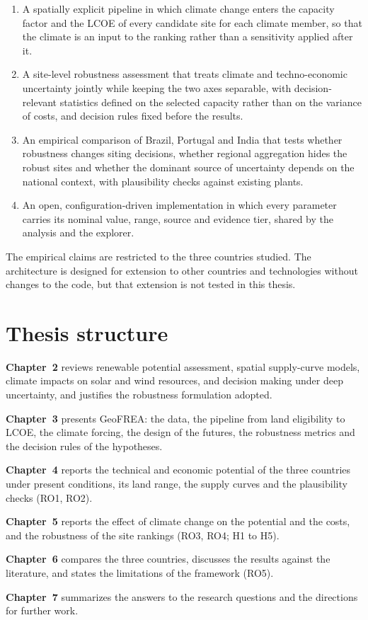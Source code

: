 \begin{enumerate}
    \item A spatially explicit pipeline in which climate change enters the capacity factor and the LCOE of every candidate site for each climate member, so that the climate is an input to the ranking rather than a sensitivity applied after it.
    \item A site-level robustness assessment that treats climate and techno-economic uncertainty jointly while keeping the two axes separable, with decision-relevant statistics defined on the selected capacity rather than on the variance of costs, and decision rules fixed before the results.
    \item An empirical comparison of Brazil, Portugal and India that tests whether robustness changes siting decisions, whether regional aggregation hides the robust sites and whether the dominant source of uncertainty depends on the national context, with plausibility checks against existing plants.
    \item An open, configuration-driven implementation in which every parameter carries its nominal value, range, source and evidence tier, shared by the analysis and the explorer.
\end{enumerate}

The empirical claims are restricted to the three countries studied. The architecture is designed for extension to other countries and technologies without changes to the code, but that extension is not tested in this thesis.

\section{Thesis structure}
\label{sec:structure}

\textbf{Chapter~2} reviews renewable potential assessment, spatial supply-curve models, climate impacts on solar and wind resources, and decision making under deep uncertainty, and justifies the robustness formulation adopted.

\textbf{Chapter~3} presents GeoFREA: the data, the pipeline from land eligibility to LCOE, the climate forcing, the design of the futures, the robustness metrics and the decision rules of the hypotheses.

\textbf{Chapter~4} reports the technical and economic potential of the three countries under present conditions, its land range, the supply curves and the plausibility checks (RO1, RO2).

\textbf{Chapter~5} reports the effect of climate change on the potential and the costs, and the robustness of the site rankings (RO3, RO4; H1 to H5).

\textbf{Chapter~6} compares the three countries, discusses the results against the literature, and states the limitations of the framework (RO5).

\textbf{Chapter~7} summarizes the answers to the research questions and the directions for further work.
